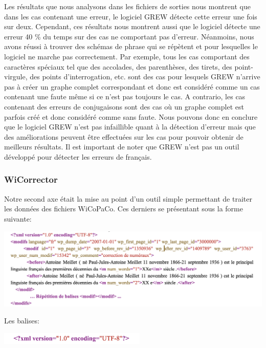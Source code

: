 \documentclass[11pt]{article}
\begin{document}
Les r\'{e}sultats que nous analysons dans les fichiers de sorties nous montrent que dans les cas contenant une erreur, le logiciel GREW d\'{e}tecte cette erreur une fois sur deux. Cependant, ces r\'{e}sultats nous montrent aussi que le logiciel d\'{e}tecte une erreur 40 \% du temps sur des cas ne comportant pas d'erreur. N\'{e}anmoins, nous avons r\'{e}ussi \`{a} trouver des sch\'{e}mas de phrase qui se r\'{e}p\`{e}tent et pour lesquelles le logiciel ne marche pas correctement. Par exemple, tous les cas comportant des caract\`{e}res sp\'{e}ciaux tel que des accolades, des parenth\`{e}ses, des tirets, des point-virgule, des points d'interrogation, etc. sont des cas pour lesquels GREW n'arrive pas \`{a} cr\'{e}er un graphe complet correspondant et donc est consid\'{e}r\'{e} comme un cas contenant une faute m\^{e}me si ce n'est pas toujours le cas. A contrario, les cas contenant des erreurs de conjugaisons sont des cas o\`{u} un graphe complet est parfois cr\'{e}\'{e} et donc consid\'{e}r\'{e} comme sans faute. Nous pouvons donc en conclure que le logiciel GREW n'est pas infaillible quant \`{a} la d\'{e}tection d'erreur mais que des am\'{e}liorations peuvent \^{e}tre effectu\'{e}es sur les cas pour pouvoir obtenir de meilleurs r\'{e}sultats. Il est important de noter que GREW n'est pas un outil d\'{e}velopp\'{e} pour d\'{e}tecter les erreurs de fran\c{c}ais.


\subsubsection{WiCorrector}
Notre second axe \'{e}tait la mise au point d'un outil simple permettant de traiter les donn\'{e}es des fichiers WiCoPaCo. Ces derniers se pr\'{e}sentant sous la forme suivante:
\begin{center}
\includegraphics[width=14cm]{exemple4.png} %
\end{center}

Les balises:
\begin{center}
\includegraphics[width=7cm]{exemple5.png} %
\end{center}
\end{document}
